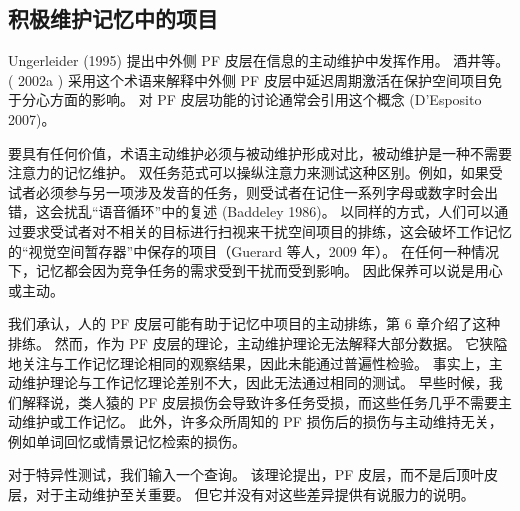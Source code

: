 \subsection{积极维护记忆中的项目}
Ungerleider (1995) 提出中外侧 PF 皮层在信息的主动维护中发挥作用。 酒井等。 ( 2002a ) 采用这个术语来解释中外侧 PF 皮层中延迟周期激活在保护空间项目免于分心方面的影响。 对 PF 皮层功能的讨论通常会引用这个概念 (D’Esposito 2007)。
\par 
要具有任何价值，术语主动维护必须与被动维护形成对比，被动维护是一种不需要注意力的记忆维护。 双任务范式可以操纵注意力来测试这种区别。例如，如果受试者必须参与另一项涉及发音的任务，则受试者在记住一系列字母或数字时会出错，这会扰乱“语音循环”中的复述 (Baddeley 1986)。 以同样的方式，人们可以通过要求受试者对不相关的目标进行扫视来干扰空间项目的排练，这会破坏工作记忆的“视觉空间暂存器”中保存的项目（Guerard 等人，2009 年）。 在任何一种情况下，记忆都会因为竞争任务的需求受到干扰而受到影响。 因此保养可以说是用心或主动。
\par 
我们承认，人的 PF 皮层可能有助于记忆中项目的主动排练，第 6 章介绍了这种排练。 然而，作为 PF 皮层的理论，主动维护理论无法解释大部分数据。 它狭隘地关注与工作记忆理论相同的观察结果，因此未能通过普遍性检验。 事实上，主动维护理论与工作记忆理论差别不大，因此无法通过相同的测试。 早些时候，我们解释说，类人猿的 PF 皮层损伤会导致许多任务受损，而这些任务几乎不需要主动维护或工作记忆。 此外，许多众所周知的 PF 损伤后的损伤与主动维持无关，例如单词回忆或情景记忆检索的损伤。
\par 
对于特异性测试，我们输入一个查询。 该理论提出，PF 皮层，而不是后顶叶皮层，对于主动维护至关重要。 但它并没有对这些差异提供有说服力的说明。
